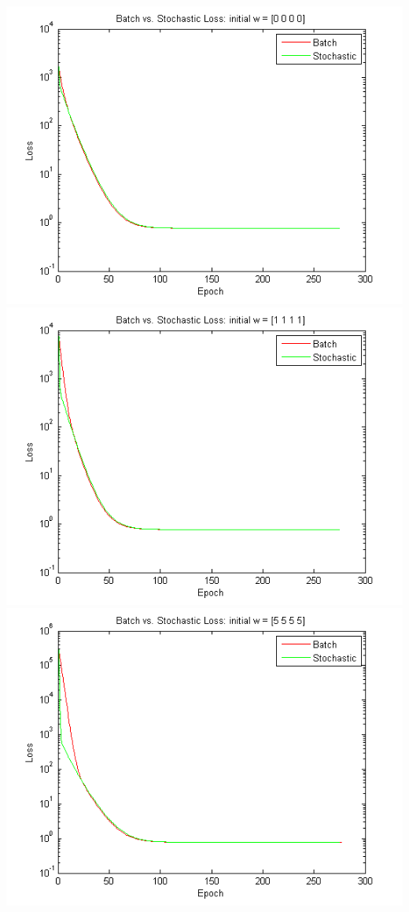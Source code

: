 \documentclass{article}
\begin{document}
\includegraphics[scale=0.75]{regression_0.png}
\includegraphics[scale=0.75]{regression_1.png}
\includegraphics[scale=0.75]{regression_5.png}
\end{document}
